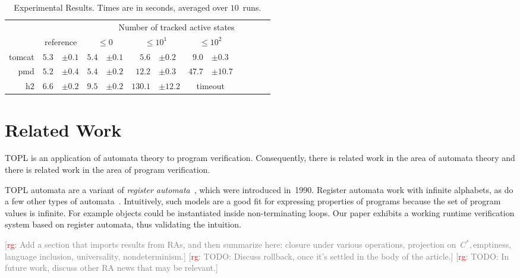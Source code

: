 \documentclass[9pt, preprint]{sigplanconf} %
\newcommand{\noterg}[2]{\textcolor{gray}{[\textcolor{red}{#1}: #2]}}
\newcommand{\rg}[1]{\noterg{rg}{#1}}
\theoremstyle{definition}
\theoremstyle{remark}
\begin{document}
\begin{table}[t]\centering
\begin{tabular}{@{}rr@{}lr@{}lr@{}lr@{}lr@{}lr@{}l}
  &&
  & \multicolumn{10}{c}{Number of tracked active states} \\ \cmidrule{4-13}
& \multicolumn{2}{c}{reference}
  &\multicolumn{2}{c}{$\le0$}
  &\multicolumn{2}{c}{$\le10^1$}
  &\multicolumn{2}{c}{$\le10^2$}
\\ \midrule
tomcat
  & $5.3$ & $\pm0.1$
  & $5.4$ & $\pm0.1$
  & $5.6$ & $\pm0.2$
  & $9.0$ & $\pm0.3$
\\
pmd
  & $5.2$ & $\pm0.4$
  & $5.4$ & $\pm0.2$
  & $12.2$ & $\pm0.3$
  & $47.7$ & $\pm10.7$
  \\
h2
  & $6.6$ & $\pm0.2$
  & $9.5$ & $\pm0.2$
  & $130.1$ & $\pm12.2$
  & \multicolumn{2}{c}{timeout}
  \\
\end{tabular}
\caption{
  Experimental Results.
  Times are in seconds, averaged over $10$~runs.
}\label{table:overhead}
\end{table}

\section{Related Work}\label{sec:related} %

TOPL is an application of automata theory to program verification.
Consequently, there is related work in the area of automata theory and there is related work in the area of program verification.

TOPL automata are a variant of {\it register automata\/}~\cite{dblp:conf/focs/kaminskif90}, which were introduced in~1990.
Register automata work with infinite alphabets, as do a few other types of automata~\cite{dblp:conf/csl/segoufin06}.
Intuitively, such models are a good fit for expressing properties of programs because the set of program values is infinite.
For example objects could be instantiated inside non-terminating loops.
Our paper exhibits a working runtime verification system based on register automata, thus validating the intuition.

\rg{Add a section that imports results from RAs, and then summarize here:
closure under various operations, projection on~$C^*, $emptiness, language inclusion, universality, nondeterminism.}
\rg{TODO: Discuss rollback, once it's settled in the body of the article.}
\rg{TODO: In future work, discuss other RA news that may be relevant.}
\end{document}
